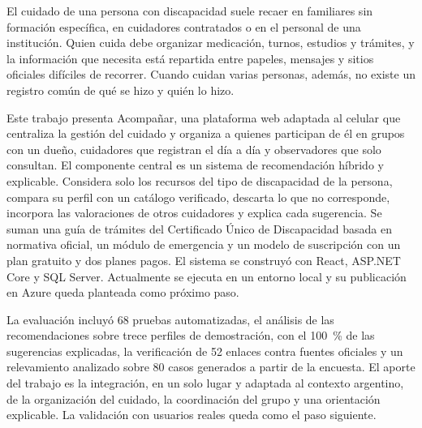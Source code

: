 
\begin{resumen}

El cuidado de una persona con discapacidad suele recaer en familiares sin
formación específica, en cuidadores contratados o en el personal de una
institución. Quien cuida debe organizar medicación, turnos, estudios y
trámites, y la información que necesita está repartida entre papeles,
mensajes y sitios oficiales difíciles de recorrer. Cuando cuidan varias
personas, además, no existe un registro común de qué se hizo y quién lo
hizo.

Este trabajo presenta Acompañar, una plataforma web adaptada al celular que
centraliza la gestión del cuidado y organiza a quienes participan de él en
grupos con un dueño, cuidadores que registran el día a día y observadores
que solo consultan. El componente central es un sistema de recomendación
híbrido y explicable. Considera solo los recursos del tipo de discapacidad
de la persona, compara su perfil con un catálogo verificado, descarta lo que
no corresponde, incorpora las valoraciones de otros cuidadores y explica
cada sugerencia. Se suman una guía de trámites del Certificado Único de
Discapacidad basada en normativa oficial, un módulo de emergencia y un modelo
de suscripción con un plan gratuito y dos planes pagos. El sistema se
construyó con React, ASP.NET Core y SQL Server. Actualmente se ejecuta en un entorno
local y su publicación en Azure queda planteada como próximo paso.

La evaluación incluyó 68 pruebas automatizadas, el análisis de las
recomendaciones sobre trece perfiles de demostración, con el 100~\% de las
sugerencias explicadas, la verificación de 52 enlaces contra fuentes
oficiales y un relevamiento analizado sobre 80 casos generados a partir de
la encuesta.
El aporte del trabajo es la integración, en un solo lugar y adaptada al
contexto argentino, de la organización del cuidado, la coordinación del
grupo y una orientación explicable. La validación con usuarios reales queda
como el paso siguiente.

\end{resumen}
